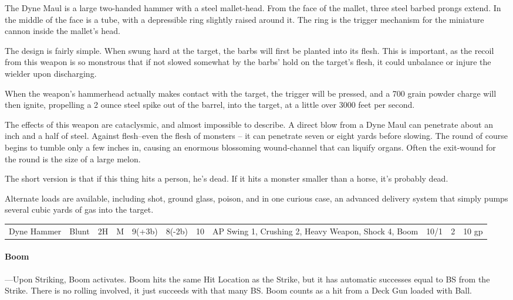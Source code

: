 \documentclass[oneside,11pt,english]{book}
\begin{document}
The Dyne Maul is a large two-handed hammer with a steel mallet-head. From the
face of the mallet, three steel barbed prongs extend. In the middle of the face
is a tube, with a depressible ring slightly raised around it. The ring is the
trigger mechanism for the miniature cannon inside the mallet’s head.

The design is fairly simple. When swung hard at the target, the barbs will first
be planted into its flesh. This is important, as the recoil from this weapon is
so monstrous that if not slowed somewhat by the barbs’ hold on the target’s
flesh, it could unbalance or injure the wielder upon discharging.

When the weapon’s hammerhead actually makes contact with the target, the trigger
will be pressed, and a 700 grain powder charge will then ignite, propelling a 2
ounce steel spike out of the barrel, into the target, at a little over 3000 feet
per second.

The effects of this weapon are cataclysmic, and almost impossible to describe. A
direct blow from a Dyne Maul can penetrate about an inch and a half of steel.
Against flesh--even the flesh of monsters -- it can penetrate seven or eight
yards before slowing. The round of course begins to tumble only a few inches in,
causing an enormous blossoming wound-channel that can liquify organs. Often the
exit-wound for the round is the size of a large melon.

The short version is that if this thing hits a person, he’s dead. If it hits a
monster smaller than a horse, it’s probably dead.

Alternate loads are available, including shot, ground glass, poison, and in one
curious case, an advanced delivery system that simply pumps several cubic yards
of gas into the target.

\begin{tabu} to 
  Dyne Hammer & Blunt & 2H & M & 9(+3b) & 8(-2b) & 10 & AP Swing 1, Crushing 2, Heavy Weapon, Shock 4, Boom & 10/1 & 2 & 10 gp \\
\end{tabu}
\paragraph{Boom}
---\quad Upon Striking, Boom activates. Boom hits the same Hit Location as the
Strike, but it has automatic successes equal to BS from the Strike. There is no
rolling involved, it just succeeds with that many BS. Boom counts as a hit from
a Deck Gun loaded with Ball. 
\end{document}
